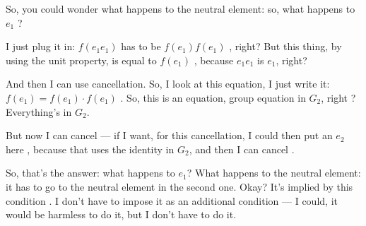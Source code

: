 \begin{content}
\end{content}

\begin{speech}[00:58:47 - 01:00:00]
So, you could wonder what happens to the neutral element: so, what happens to $e_1$ ?

I just plug it in: $f(e_1 e_1)$ has to be $f(e_1) f(e_1)$ , right? But this thing, by using the unit property, is equal to $f(e_1)$ , because $e_1 e_1$ is $e_1$, right?

And then I can use cancellation. So, I look at this equation, I just write it: $f(e_1) = f(e_1) \cdot f(e_1)$ . So, this is an equation, group equation in $G_2$, right ? Everything's in $G_2$.

But now I can cancel --- if I want, for this cancellation, I could then put an $e_2$ here , because that uses the identity in $G_2$, and then I can cancel .

So, that's the answer: what happens to $e_1$? What happens to the neutral element: it has to go to the neutral element in the second one. Okay? It's implied by this condition . I don't have to impose it as an additional condition --- I could, it would be harmless to do it, but I don't have to do it.
\end{speech}

